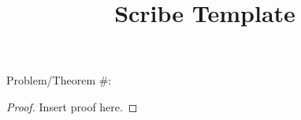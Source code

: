 \documentclass[english,course]{article}
\title{Scribe Template}
\theoremstyle{plain}
\begin{document}
\maketitle


Problem/Theorem \#: 

\begin{proof}
	Insert proof here.
\end{proof}
\end{document}
